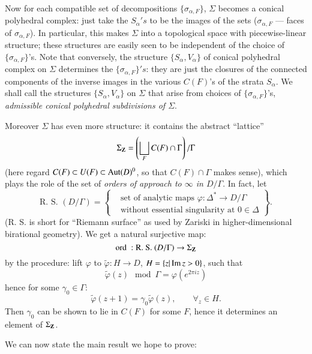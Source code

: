 Now for each compatible set of decompositions $\{\sigma_{\alpha, F}\}$, $\Sigma$  becomes a conical polyhedral complex: just take the $S_\alpha's$ to be the images of the sets ($\sigma_{\alpha, F}$ --- faces of $\sigma_{\alpha, F}$). In particular, this makes $\Sigma$ into a topological space with piecewise-linear structure; these structures are easily seen to be independent of the choice of $\{\sigma_{\alpha, F}\}$'s. Note that conversely, the structure $\{S_\alpha, V_\alpha\}$ of conical polyhedral complex on $\Sigma$ determines the $\{\sigma_{\alpha, F}\}'s$: they are just the closures of the connected components of the inverse images in the various $C(F)$'s of the strata $S_\alpha$. We shall call the structures $\{S_\alpha, V_\alpha\}$ on $\Sigma$ that arise from choices of $\{\sigma_{\alpha, F}\}$'s, \textit{admissible conical polyhedral subdivisions of $\Sigma$}.

Moreover $\Sigma$ has even more structure: it contains the abstract ``lattice''
$$
\Sigma_{\mathbf{Z}} = \left(\bigsqcup\limits_F C (F) \cap \Gamma \right) /\Gamma
$$
(here regard $C(F) \subset U (F) \subset \operatorname{Aut} (D)^0$, so that $C(F) \cap \Gamma$ makes sense), which plays the role of the set of \textit{orders of approach to $\infty$ in $D/ \Gamma$}. In fact, let
$$
\text{R. S. } (D/\Gamma) = 
\left\{
\begin{aligned}
& \text{set of analytic maps $\varphi : \Delta^\ast \to D/\Gamma$}\\
& \text{without essential singularity at } 0 \in\Delta
\end{aligned} 
\right\}.
$$
(R. S. is short for ``Riemann surface'' as used by Zariski in higher-dimensional birational geometry). We get a natural surjective map:
$$
\text{ord } : \text{R. S. } (D/\Gamma) \to \Sigma_{\mathbf{Z}}
$$\pageoriginale 
by the procedure: lift $\varphi$ to $\tilde{\varphi}: H \to D$, $H = \{z | \operatorname{Im} z > 0\}$, such that 
$$
\tilde{\varphi} (z) \mod \Gamma = \varphi (e^{2\pi i z})
$$
hence for some $\gamma_0 \in \Gamma$:
$$
\tilde{\varphi} (z+1) = \gamma_0 \tilde{\varphi}(z), \qquad \forall_z \in H.
$$
Then $\gamma_0$ can be shown to lie in $C(F)$ for some $F$, hence it determines an element of $\Sigma_{\mathbf{Z}}$.

We can now state the main result we hope to prove:


